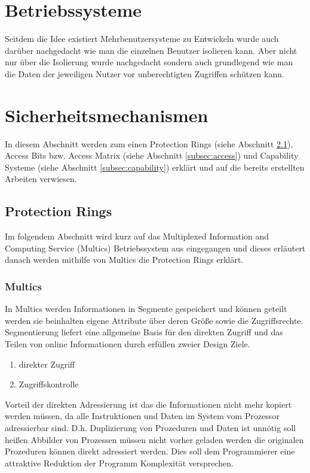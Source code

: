 \documentclass[9pt,technote]{IEEEtran}
\begin{document}
   \section{Betriebssysteme}
     Seitdem die Idee existiert Mehrbenutzersysteme zu Entwickeln wurde auch dar\"uber nachgedacht wie man die einzelnen Benutzer isolieren kann.
     Aber nicht nur \"uber die Isolierung wurde nachgedacht sondern auch grundlegend wie man die Daten 
     der jeweiligen Nutzer vor unberechtigten Zugriffen sch\"utzen kann.
     
  \section{Sicherheitsmechanismen} \label{sec:protection}
    In diesem Abschnitt werden zum einen Protection Rings (siehe Abschnitt \ref{subsec:protectrings}), Access Bits bzw. Access Matrix 
    (siehe Abschnitt \ref{subsec:access}) und Capability Systeme (siehe Abschnitt \ref{subsec:capability}) erkl\"art und 
    auf die bereits erstellten Arbeiten verwiesen.
    \subsection{Protection Rings} \label{subsec:protectrings}
      Im folgendem Abschnitt wird kurz auf das Multiplexed Information and Computing Service (Multics) Betriebssystem
      aus \cite{inproc:multics} eingegangen und dieses erl\"autert danach werden mithilfe von Multics die Protection Rings erkl\"art.
      \subsubsection{Multics}  
        In Multics werden Informationen in Segmente gespeichert und k\"onnen geteilt 
				werden sie beinhalten eigene Attribute \"uber deren Gr\"o\ss e sowie die Zugriffsrechte.
				Segmentierung liefert eine allgemeine Basis f\"ur den direkten Zugriff und das Teilen von online Informationen durch erf\"ullen zweier Design Ziele.
		    \begin{enumerate}
		      \item direkter Zugriff
		      \item Zugriffskontrolle
        \end{enumerate}
		    Vorteil der direkten Adressierung ist das die Informationen nicht mehr kopiert werden m\"ussen, da alle Instruktionen und Daten
		    im System vom Prozessor adressierbar sind. D.h. Duplizierung von Prozeduren und Daten ist unn\"otig soll hei\ss en Abbilder von Prozessen m\"ussen
		    nicht vorher geladen werden die originalen Prozeduren k\"onnen direkt adressiert werden.
		    Dies soll dem Programmierer eine attraktive Reduktion der Programm Komplexit\"at versprechen.
		  
\end{document}
